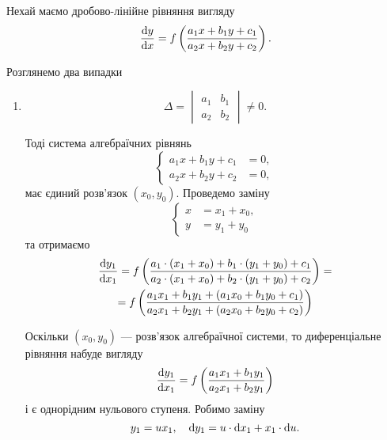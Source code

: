 Нехай маємо дробово-лінійне рівняння вигляду
\begin{equation*}
	\frac{\mathop{}\!\mathrm{d} y}{\mathop{}\!\mathrm{d} x} = f \left( \frac{a_1 x + b_1 y + c_1}{a_2 x + b_2 y + c_2} \right).
\end{equation*}

Розглянемо два випадки
\begin{enumerate}
	\item 
	\begin{equation*}
		\Delta = 
		\begin{vmatrix} 
			a_1 & b_1 \\ 
			a_2 & b_2 
		\end{vmatrix} 
		\ne 0.
	\end{equation*}

	Тоді система алгебраїчних рівнянь
	\begin{equation*}
		\left\{
			\begin{aligned}
				a_1 x + b_1 y + c_1 &= 0, \\
				a_2 x + b_2 y + c_2 &= 0,
			\end{aligned}
		\right.
	\end{equation*}
	має єдиний розв’язок $(x_0, y_0)$. Проведемо заміну 
	\begin{equation*}
		\left\{
			\begin{aligned}
			x &= x_1 + x_0, \\
			y &= y_1 + y_0
			\end{aligned}
		\right.
	\end{equation*}
	та отримаємо
	\begin{multline*}
		\frac{\mathop{}\!\mathrm{d} y_1}{\mathop{}\!\mathrm{d} x_1} = f \left( \frac{a_1 \cdot (x_1 + x_0) + b_1 \cdot (y_1 + y_0) + c_1}{a_2 \cdot (x_1 + x_0) + b_2 \cdot (y_1 + y_0) + c_2} \right) = \\
		= f \left( \frac{a_1 x_1 + b_1 y_1 + (a_1 x_0 + b_1 y_0 + c_1)}{a_2 x_1 + b_2 y_1 + (a_2 x_0 + b_2 y_0 + c_2)} \right)
	\end{multline*}

	Оскільки $(x_0, y_0)$ --- розв’язок алгебраїчної системи, то диференціальне рівняння набуде вигляду
	\begin{equation*}
		\frac{\mathop{}\!\mathrm{d} y_1}{\mathop{}\!\mathrm{d} x_1} = f \left( \frac{a_1 x_1 + b_1 y_1}{a_2 x_1 + b_2 y_1} \right)
	\end{equation*}
	і є однорідним нульового ступеня. Робимо заміну 
	\begin{equation*}
		y_1 = u x_1, \quad \mathop{}\!\mathrm{d} y_1 = u \cdot \mathop{}\!\mathrm{d} x_1 + x_1 \cdot \mathop{}\!\mathrm{d} u.
	\end{equation*}


\end{enumerate}
